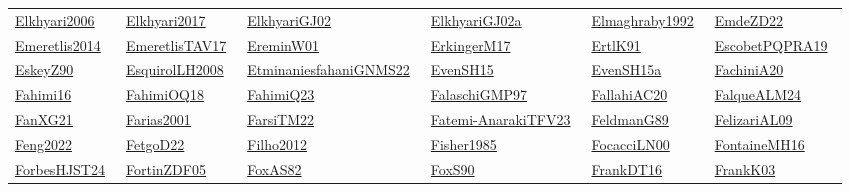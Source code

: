 \begin{longtable}{*{6}{l}}
\href{../}{Elkhyari2006}~\cite{Elkhyari2006} & \href{../}{Elkhyari2017}~\cite{Elkhyari2017} & \href{../works/ElkhyariGJ02.pdf}{ElkhyariGJ02}~\cite{ElkhyariGJ02} & \href{../works/ElkhyariGJ02a.pdf}{ElkhyariGJ02a}~\cite{ElkhyariGJ02a} & \href{../}{Elmaghraby1992}~\cite{Elmaghraby1992} & \href{../works/EmdeZD22.pdf}{EmdeZD22}~\cite{EmdeZD22}\\ 
\href{../}{Emeretlis2014}~\cite{Emeretlis2014} & \href{../works/EmeretlisTAV17.pdf}{EmeretlisTAV17}~\cite{EmeretlisTAV17} & \href{../works/EreminW01.pdf}{EreminW01}~\cite{EreminW01} & \href{../works/ErkingerM17.pdf}{ErkingerM17}~\cite{ErkingerM17} & \href{../works/ErtlK91.pdf}{ErtlK91}~\cite{ErtlK91} & \href{../works/EscobetPQPRA19.pdf}{EscobetPQPRA19}~\cite{EscobetPQPRA19}\\ 
\href{../works/EskeyZ90.pdf}{EskeyZ90}~\cite{EskeyZ90} & \href{../}{EsquirolLH2008}~\cite{EsquirolLH2008} & \href{../works/EtminaniesfahaniGNMS22.pdf}{EtminaniesfahaniGNMS22}~\cite{EtminaniesfahaniGNMS22} & \href{../works/EvenSH15.pdf}{EvenSH15}~\cite{EvenSH15} & \href{../works/EvenSH15a.pdf}{EvenSH15a}~\cite{EvenSH15a} & \href{../works/FachiniA20.pdf}{FachiniA20}~\cite{FachiniA20}\\ 
\href{../works/Fahimi16.pdf}{Fahimi16}~\cite{Fahimi16} & \href{../works/FahimiOQ18.pdf}{FahimiOQ18}~\cite{FahimiOQ18} & \href{../}{FahimiQ23}~\cite{FahimiQ23} & \href{../works/FalaschiGMP97.pdf}{FalaschiGMP97}~\cite{FalaschiGMP97} & \href{../works/FallahiAC20.pdf}{FallahiAC20}~\cite{FallahiAC20} & \href{../works/FalqueALM24.pdf}{FalqueALM24}~\cite{FalqueALM24}\\ 
\href{../works/FanXG21.pdf}{FanXG21}~\cite{FanXG21} & \href{../}{Farias2001}~\cite{Farias2001} & \href{../works/FarsiTM22.pdf}{FarsiTM22}~\cite{FarsiTM22} & \href{../works/Fatemi-AnarakiTFV23.pdf}{Fatemi-AnarakiTFV23}~\cite{Fatemi-AnarakiTFV23} & \href{../works/FeldmanG89.pdf}{FeldmanG89}~\cite{FeldmanG89} & \href{../}{FelizariAL09}~\cite{FelizariAL09}\\ 
\href{../}{Feng2022}~\cite{Feng2022} & \href{../works/FetgoD22.pdf}{FetgoD22}~\cite{FetgoD22} & \href{../}{Filho2012}~\cite{Filho2012} & \href{../}{Fisher1985}~\cite{Fisher1985} & \href{../works/FocacciLN00.pdf}{FocacciLN00}~\cite{FocacciLN00} & \href{../works/FontaineMH16.pdf}{FontaineMH16}~\cite{FontaineMH16}\\ 
\href{../works/ForbesHJST24.pdf}{ForbesHJST24}~\cite{ForbesHJST24} & \href{../works/FortinZDF05.pdf}{FortinZDF05}~\cite{FortinZDF05} & \href{../works/FoxAS82.pdf}{FoxAS82}~\cite{FoxAS82} & \href{../works/FoxS90.pdf}{FoxS90}~\cite{FoxS90} & \href{../works/FrankDT16.pdf}{FrankDT16}~\cite{FrankDT16} & \href{../works/FrankK03.pdf}{FrankK03}~\cite{FrankK03}\\ 

\end{longtable}
